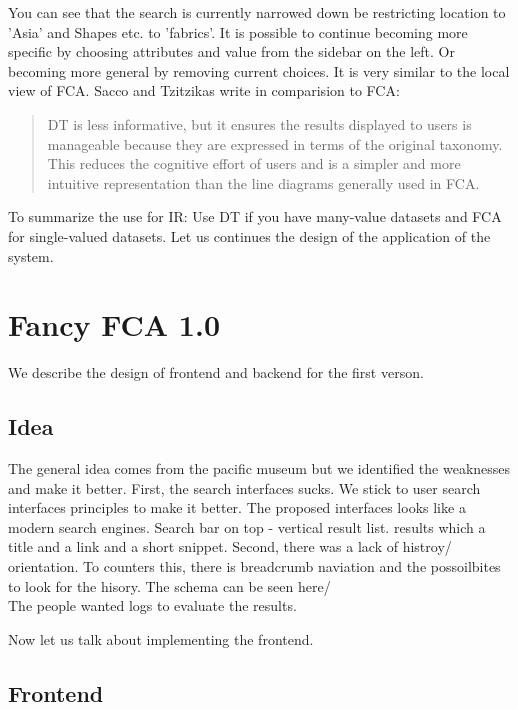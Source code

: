 \documentclass[11pt]{report}
\begin{document}
You can see that the search is currently narrowed down be restricting location to 'Asia' and Shapes etc. to 'fabrics'. It is possible to continue becoming more specific by choosing attributes and value from the sidebar on the left. Or becoming more general by removing current choices. It is very similar to the local view of FCA. Sacco and Tzitzikas \cite{Sacco2009} write in comparision to FCA:
\begin{quote}
DT is less informative, but it ensures the results displayed to users is manageable because they are expressed in terms of the original taxonomy. This reduces the cognitive effort of users and is a simpler and more intuitive representation than the line diagrams generally used in FCA.
\end{quote}

To summarize the use for IR: Use DT if you have many-value datasets and FCA for single-valued datasets. Let us continues the design of the application of the system.

\chapter{Fancy FCA 1.0}

We describe the design of frontend and backend for the first verson.

\section{Idea}

The general idea comes from the pacific museum but we identified the weaknesses and make it better.
First, the search interfaces sucks. We stick to user search interfaces principles to make it better. The proposed interfaces looks like a modern search engines. Search bar on top - vertical result list. results which a title and a link and a short snippet.
Second, there was a lack of histroy/ orientation. To counters this, there is breadcrumb naviation and the possoilbites to look for the hisory.
The schema can be seen here/ \\

The people wanted logs to evaluate the results.

Now let us talk about implementing the frontend.

\section{Frontend}
\end{document}

